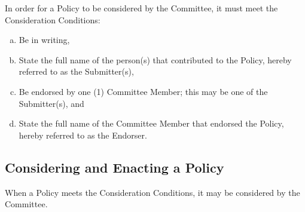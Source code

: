 \documentclass[a4paper,12pt]{article}
\begin{document}
In order for a Policy to be considered by the Committee, it must meet the Consideration Conditions:

\begin{enumerate}[a)]
	\item Be in writing,
	\item State the full name of the person(s) that contributed to the Policy, hereby referred to as the Submitter(s),
	\item Be endorsed by one (1) Committee Member; this may be one of the Submitter(s), and
	\item State the full name of the Committee Member that endorsed the Policy, hereby referred to as the Endorser.
\end{enumerate}

\subsection{Considering and Enacting a Policy}

When a Policy meets the Consideration Conditions, it may be considered by the Committee.
\end{document}
